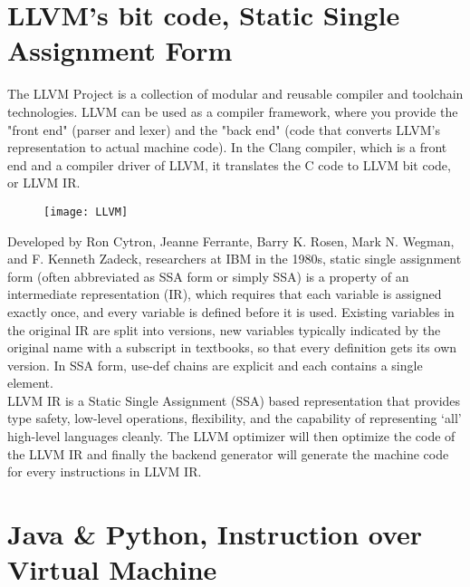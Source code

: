 \section{LLVM's bit code, Static Single Assignment Form}
The LLVM Project is a collection of modular and reusable compiler and toolchain technologies. LLVM can be used as a compiler framework, where you provide the "front end" (parser and lexer) and the "back end" (code that converts LLVM's representation to actual machine code). In the Clang compiler, which is a front end and a compiler driver of LLVM, it translates the C code to LLVM bit code, or LLVM IR. \\
\begin{figure}[h]
\centering
\texttt{[image: LLVM]}
\end{figure}
Developed by Ron Cytron, Jeanne Ferrante, Barry K. Rosen, Mark N. Wegman, and F. Kenneth Zadeck, researchers at IBM in the 1980s, static single assignment form (often abbreviated as SSA form or simply SSA) is a property of an intermediate representation (IR), which requires that each variable is assigned exactly once, and every variable is defined before it is used. Existing variables in the original IR are split into versions, new variables typically indicated by the original name with a subscript in textbooks, so that every definition gets its own version. In SSA form, use-def chains are explicit and each contains a single element. \\
LLVM IR is a Static Single Assignment (SSA) based representation that provides type safety, low-level operations, flexibility, and the capability of representing ‘all’ high-level languages cleanly. The LLVM optimizer will then optimize the code of the LLVM IR and finally the backend generator will generate the machine code for every instructions in LLVM IR. \\


\section{Java \& Python, Instruction over Virtual Machine}
